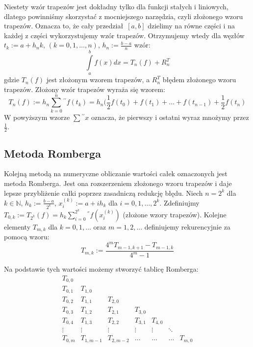 \documentclass[a4paper,12pt]{article}
\begin{document}
\noindent Niestety wzór trapezów jest dokładny tylko dla funkcji stałych 
i liniowych, dlatego powinniśmy skorzystać z mocniejszego narzędzia, czyli
złożonego wzoru trapezów. Oznacza to, że cały przedział $[a,b]$ dzielimy na
równe części i na każdej z części wykorzystujemy wzór trapezów. Otrzymujemy 
wtedy dla węzłów $t_k := a+h_nk$, $(k=0,1,\ldots, n)$, $h_n:=\frac{b-a}{n}$ 
wzór:
\[ 
    \int\limits_{a}^{b} f(x)dx = T_n(f) + R_n^T
\]
\noindent gdzie $T_n(f)$ jest złożonym wzorem trapezów, a $R_n^T$ błędem 
złożonego wzoru trapezów. Złożony wzór trapezów wyraża się wzorem:
\[ 
    T_n(f) := h_n \sum\limits_{k=0}^{n}{}^{\prime\prime} f(t_k) 
    = h_n(\frac{1}{2}f(t_0) + f(t_1) + \ldots + f(t_{n-1}) + \frac{1}{2}f(t_n) 
\]
\noindent W powyższym wzorze $\sum{}^{\prime\prime}x$ oznacza, że pierwszy i ostatni 
wyraz mnożymy przez $\frac{1}{2}$. \\

\subsection{Metoda Romberga}
Kolejną metodą na numeryczne obliczanie wartości całek oznaczonych jest metoda
Romberga. Jest ona rozszerzeniem złożonego wzoru trapezów i daje lepsze przybliżenie
całki poprzez zasadniczą redukcję błędu. Niech $n=2^k$ dla $k \in \mathbb{N}$, $h_k := \frac{b-a}{2^k}$, $x_i^{(k)} := a+ih_k$ dla $i=0,1,\ldots, 2^k$. Zdefiniujmy 
$T_{0,k} := T_{2^k}(f) = h_k\sum\limits_{i=0}^{2^k}{}^{''}f(x_i^{(k)})$ 
(złożone wzory trapezów). Kolejne elementy $T_{m,k}$ dla $k = 0,1,\ldots$ oraz
$m=1,2,\ldots$ definiujemy rekurencyjnie za pomocą wzoru:
\[
    T_{m, k} := \frac{4^mT_{m-1, k+1} - T_{m-1, k}}{4^m-1}
\]

\noindent Na podstawie tych wartości możemy stworzyć tablicę Romberga:
\[
    \begin{array}{ccccccc} 
        T_{0,0}	\\	
        T_{0,1}	&	T_{1,0}	\\
        T_{0,2}	&	T_{1,1}	&	T_{2,0}	\\
        T_{0,3}	&	T_{1,2}	&	T_{2,1}	&	T_{3,0}	\\
        T_{0,4}	&	T_{1,3}	&	T_{2,2}	&	T_{3,1}	&	T_{4,0}	\\
        \vdots 	&	\vdots 	&	\vdots 	&	\vdots 	&	\vdots 	&	\ddots 	\\
        T_{0,m}	&	T_{1, m-1}	&	T_{2, m-2}	&	\ldots 		&	\ldots 		& 	\ldots 		& 	T_{m, 0}
    \end{array}
\]
\end{document}
